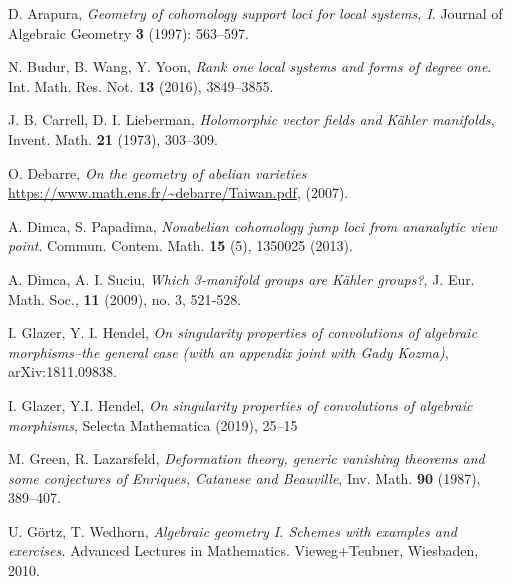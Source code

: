\documentclass[a4paper,12pt,reqno]{amsart}
\theoremstyle{plain}
\theoremstyle{remark}
\begin{document}
\begin{thebibliography}{HKLR} 





 D. Arapura, \textit{Geometry of cohomology support loci for local systems, I}. Journal of Algebraic Geometry \textbf{3} (1997): 563--597.


 N. Budur, B. Wang, Y. Yoon, \textit{Rank one local systems and forms of degree one}. Int. Math. Res. Not. \textbf{13} (2016), 3849--3855.



 J. B. Carrell, D. I. Lieberman,  \textit{Holomorphic vector fields and K\"ahler manifolds}, Invent. Math. \textbf{21} (1973), 303--309.

 O. Debarre,  \textit{On the geometry of abelian varieties} \url{https://www.math.ens.fr/~debarre/Taiwan.pdf}, (2007).

A. Dimca, S. Papadima, \textit{Nonabelian cohomology jump loci from ananalytic view point}. Commun. Contem. Math. \textbf{15} (5), 1350025 (2013).


 A. Dimca, A. I. Suciu, \textit{Which 3-manifold groups are K\"ahler groups?}, J. Eur. Math. Soc., \textbf{11} (2009), no. 3, 521-528.

 I. Glazer, Y. I. Hendel, \textit{On singularity properties of convolutions of algebraic morphisms--the general case (with an appendix joint with Gady Kozma)}, arXiv:1811.09838.

  I. Glazer, Y.I. Hendel, \textit{On singularity properties of convolutions of algebraic morphisms}, Selecta Mathematica (2019), 25--15


 M. Green, R. Lazarsfeld, \textit{Deformation theory, generic vanishing theorems and some conjectures of Enriques, Catanese and Beauville}, Inv. Math. \textbf{90} (1987), 389--407.

 U. G\"ortz, T. Wedhorn, \textit{Algebraic geometry I. Schemes with examples and exercises.} Advanced Lectures in Mathematics. Vieweg+Teubner, Wiesbaden, 2010. 


\end{thebibliography}
\end{document}
